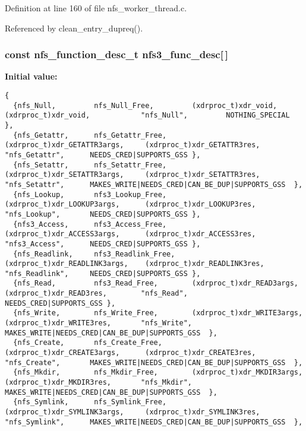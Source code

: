 Definition at line 160 of file nfs\_\-worker\_\-thread.c.

Referenced by clean\_\-entry\_\-dupreq().
\subsubsection{\setlength{\rightskip}{0pt plus 5cm}const nfs\_\-function\_\-desc\_\-t {\bf nfs3\_\-func\_\-desc}[$\,$]}\label{nfs__worker__thread_8c_a13}


{\bf Initial value:}

\footnotesize\begin{verbatim} 
{
  {nfs_Null,         nfs_Null_Free,         (xdrproc_t)xdr_void,             (xdrproc_t)xdr_void,            "nfs_Null",         NOTHING_SPECIAL  },
  {nfs_Getattr,      nfs_Getattr_Free,      (xdrproc_t)xdr_GETATTR3args,     (xdrproc_t)xdr_GETATTR3res,     "nfs_Getattr",      NEEDS_CRED|SUPPORTS_GSS },
  {nfs_Setattr,      nfs_Setattr_Free,      (xdrproc_t)xdr_SETATTR3args,     (xdrproc_t)xdr_SETATTR3res,     "nfs_Setattr",      MAKES_WRITE|NEEDS_CRED|CAN_BE_DUP|SUPPORTS_GSS  },
  {nfs_Lookup,       nfs3_Lookup_Free,      (xdrproc_t)xdr_LOOKUP3args,      (xdrproc_t)xdr_LOOKUP3res,      "nfs_Lookup",       NEEDS_CRED|SUPPORTS_GSS },
  {nfs3_Access,      nfs3_Access_Free,      (xdrproc_t)xdr_ACCESS3args,      (xdrproc_t)xdr_ACCESS3res,      "nfs3_Access",      NEEDS_CRED|SUPPORTS_GSS },
  {nfs_Readlink,     nfs3_Readlink_Free,    (xdrproc_t)xdr_READLINK3args,    (xdrproc_t)xdr_READLINK3res,    "nfs_Readlink",     NEEDS_CRED|SUPPORTS_GSS },
  {nfs_Read,         nfs3_Read_Free,        (xdrproc_t)xdr_READ3args,        (xdrproc_t)xdr_READ3res,        "nfs_Read",         NEEDS_CRED|SUPPORTS_GSS },
  {nfs_Write,        nfs_Write_Free,        (xdrproc_t)xdr_WRITE3args,       (xdrproc_t)xdr_WRITE3res,       "nfs_Write",        MAKES_WRITE|NEEDS_CRED|CAN_BE_DUP|SUPPORTS_GSS  },
  {nfs_Create,       nfs_Create_Free,       (xdrproc_t)xdr_CREATE3args,      (xdrproc_t)xdr_CREATE3res,      "nfs_Create",       MAKES_WRITE|NEEDS_CRED|CAN_BE_DUP|SUPPORTS_GSS  },
  {nfs_Mkdir,        nfs_Mkdir_Free,        (xdrproc_t)xdr_MKDIR3args,       (xdrproc_t)xdr_MKDIR3res,       "nfs_Mkdir",        MAKES_WRITE|NEEDS_CRED|CAN_BE_DUP|SUPPORTS_GSS  },
  {nfs_Symlink,      nfs_Symlink_Free,      (xdrproc_t)xdr_SYMLINK3args,     (xdrproc_t)xdr_SYMLINK3res,     "nfs_Symlink",      MAKES_WRITE|NEEDS_CRED|CAN_BE_DUP|SUPPORTS_GSS  },

\end{verbatim}
